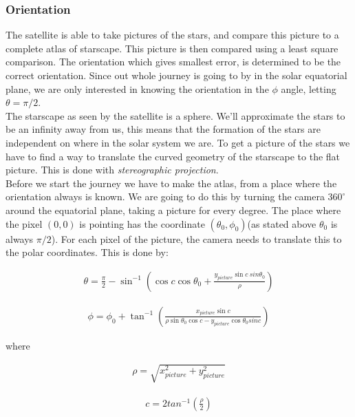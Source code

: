 \documentclass[a4paper, 10pt]{article}
\begin{document}
\subsubsection{Orientation}
The satellite is able to take pictures of the stars, and compare this picture to a complete atlas of starscape. This picture is then compared using a least square comparison. The orientation which gives smallest error, is determined to be the correct orientation. Since out whole journey is going to by in the solar equatorial plane, we are only interested in knowing the orientation in the $\phi$ angle, letting $\theta = \pi /2$.\\

The starscape as seen by the satellite is a sphere. We'll approximate the stars to be an infinity away from us, this means that the formation of the stars are independent on where in the solar system we are. To get a picture of the stars we have to find a way to translate the curved geometry of the starscape to the flat picture. This is done with \textit{stereographic projection}\cite{part4}.\\

Before we start the journey we have to make the atlas, from a place where the orientation always is known. We are going to do this by turning the camera $360^\circ$ around the equatorial plane, taking a picture for every degree. The place where the pixel $(0,0)$ is pointing has the coordinate $(\theta_0,\phi_0)$(as stated above $\theta_0$ is always $\pi/2$). For each pixel of the picture, the camera needs to translate this to the polar coordinates. This is done by: 

\begin{align}
\theta = \frac{\pi}{2} - \sin^{-1}\left( \cos c \cos \theta_0 + \frac{y_{picture}\sin c\ sin \theta_0}{\rho} \right)
\end{align}

\begin{align}
\phi = \phi_0 + \tan^{-1} \left( \frac{x_{picture}\sin c}{\rho \sin \theta_0 \cos c - y_{picture}\cos \theta_0 sin c} \right)
\end{align}

where 

\begin{align}
\rho = \sqrt{x_{picture}^2 + y_{picture}^2}
\end{align}

\begin{align}
c = 2tan^{-1} \left( \frac{\rho}{2} \right)
\end{align}
\end{document}
